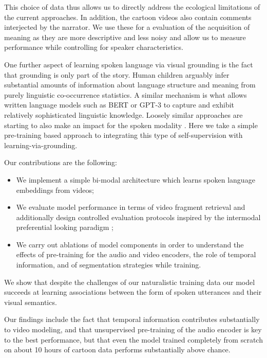 This choice of data thus allows us to directly address the ecological limitations 
of the current approaches. In addition, the cartoon videos also contain 
comments interjected by the narrator. We use these for a evaluation of the 
acquisition of meaning as they are more descriptive and less noisy and allow 
us to measure performance while controlling for speaker characteristics.

One further aspect of learning spoken language via visual grounding is
the fact that grounding is only part of the story. Human children
arguably infer substantial amounts of information about language
structure and meaning from purely linguistic co-occurrence
statistics. A similar mechanism is what allows written language models
such as BERT \citep{devlin-etal-2019-bert} or GPT-3 \citep{brown2020language} to capture and exhibit relatively sophisticated
linguistic knowledge. Loosely similar approaches are starting to also
make an impact for the spoken modality
\citep[e.g.][]{wav2vec2,hsu2021hubert}. Here we take a simple
pre-training based approach to integrating this type of
self-supervision with learning-via-grounding.

Our contributions are the following:
\begin{itemize}
\item We implement a simple bi-modal architecture which learns
  spoken language embeddings from videos;
\item We evaluate model performance in terms of video fragment
  retrieval and additionally design controlled evaluation
  protocols inspired by the intermodal preferential looking
  paradigm \citep{hirsh1996intermodal};
\item We carry out ablations of model components in order to
  understand the effects of pre-training for the audio and video
  encoders, the role of temporal information, and of segmentation
  strategies while training. 
\end{itemize}
We show that despite the challenges of our naturalistic training data
our model succeeds at learning associations between the form of spoken 
utterances and their visual semantics.

Our findings include the fact that temporal information
contributes substantially to video modeling, and that unsupervised
pre-training of the audio encoder is key to the best performance, but that
even the model trained completely from scratch on about 10 hours of
cartoon data performs substantially above chance.



